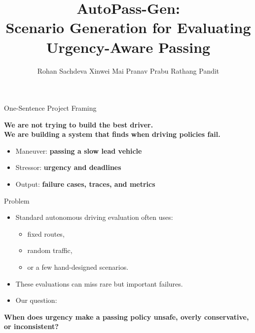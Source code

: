 \documentclass[aspectratio=169,11pt]{beamer}
\title[AutoPass-Gen]{AutoPass-Gen:\\
Scenario Generation for Evaluating Urgency-Aware Passing}
\author{Rohan Sachdeva \quad Xinwei Mai \quad Pranav Prabu \quad Rathang Pandit}
\institute{UC San Diego}
\date{}
\begin{document}
\begin{frame}
\titlepage
\end{frame}

\begin{frame}{One-Sentence Project Framing}
\begin{center}
\Large
\textbf{We are not trying to build the best driver.}\\[8pt]
\textbf{We are building a system that finds when driving policies fail.}
\end{center}

\vspace{14pt}

\begin{itemize}
\item Maneuver: \textbf{passing a slow lead vehicle}
\item Stressor: \textbf{urgency and deadlines}
\item Output: \textbf{failure cases, traces, and metrics}
\end{itemize}
\end{frame}

\begin{frame}{Problem}
\begin{itemize}
\item Standard autonomous driving evaluation often uses:
\begin{itemize}
\item fixed routes,
\item random traffic,
\item or a few hand-designed scenarios.
\end{itemize}

\pause

\item These evaluations can miss rare but important failures.

\pause

\item Our question:
\end{itemize}

\vspace{8pt}
\begin{center}
\Large
\textbf{When does urgency make a passing policy unsafe, overly conservative, or inconsistent?}
\end{center}
\end{frame}
\end{document}
